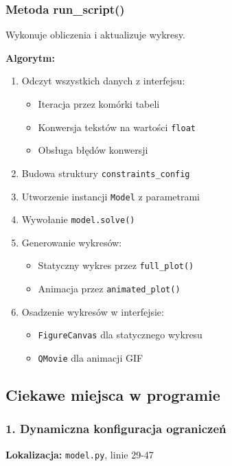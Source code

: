 \documentclass[12pt,a4paper]{article}
\begin{document}
\begin{enumerate}
\subsubsection{Metoda run\_script()}

Wykonuje obliczenia i aktualizuje wykresy.

\textbf{Algorytm:}
\begin{enumerate}
    \item Odczyt wszystkich danych z interfejsu:
    \begin{itemize}
        \item Iteracja przez komórki tabeli
        \item Konwersja tekstów na wartości \texttt{float}
        \item Obsługa błędów konwersji
    \end{itemize}
    \item Budowa struktury \texttt{constraints\_config}
    \item Utworzenie instancji \texttt{Model} z parametrami
    \item Wywołanie \texttt{model.solve()}
    \item Generowanie wykresów:
    \begin{itemize}
        \item Statyczny wykres przez \texttt{full\_plot()}
        \item Animacja przez \texttt{animated\_plot()}
    \end{itemize}
    \item Osadzenie wykresów w interfejsie:
    \begin{itemize}
        \item \texttt{FigureCanvas} dla statycznego wykresu
        \item \texttt{QMovie} dla animacji GIF
    \end{itemize}
\end{enumerate}

\subsection{Ciekawe miejsca w programie}

\subsubsection{1. Dynamiczna konfiguracja ograniczeń}

\textbf{Lokalizacja:} \texttt{model.py}, linie 29-47


\end{enumerate}
\end{document}
